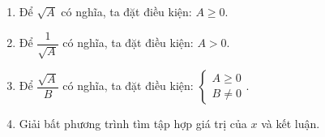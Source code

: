 \begin{enumerate}
\item Để $\sqrt{A}$ có nghĩa, ta đặt điều kiện: $\boxed{A \ge 0}$.
\item Để $\dfrac{1}{\sqrt{A}}$ có nghĩa, ta đặt điều kiện: $\boxed{A > 0}$.
\item Để $\dfrac{\sqrt{A}}{B}$ có nghĩa, ta đặt điều kiện: $\boxed{\begin{cases} A \ge 0 \\ B \ne 0 \end{cases}}$.
\item Giải bất phương trình tìm tập hợp giá trị của $x$ và kết luận.
\end{enumerate}
